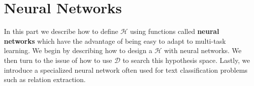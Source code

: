 \chapter{Neural Networks}
\label{neural_networks}

In this part we describe how to define $\mathcal{H}$ using functions called \textbf{neural networks} which have the advantage of being easy to adapt to multi-task learning. We begin by describing how to design a $\mathcal{H}$ with neural networks. We then turn to the issue of how to use $\mathcal{D}$ to search this hypothesis space. Lastly, we introduce a specialized neural network often used for text classification problems such as relation extraction.




